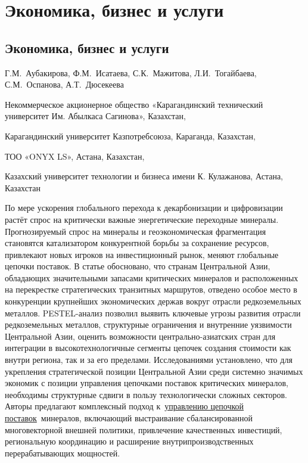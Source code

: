 \let\cleardoublepage\clearpage
\part{Экономика, бизнес и услуги}
\let\cleardoublepage\clearpage
\chapter{Экономика, бизнес и услуги}

\begin{header}

Г.М.~Аубакирова,
Ф.М.~Исатаева\envelope,
С.К.~Мажитова,
Л.И.~Тогайбаева,
С.М.~Оспанова,
А.Т.~Дюсекеева
\end{header}

\begin{affil}
Некоммерческое акционерное общество «Карагандинский технический университет Им. Абылкаса Сагинова», Казахстан,

Карагандинский университет Казпотребсоюза, Караганда, Казахстан,

ТОО «ONYX LS», Астана, Казахстан,

Казахский университет технологии и бизнеса имени К. Кулажанова, Астана, Казахстан

\end{affil}

По мере ускорения глобального перехода к декарбонизации и цифровизации
растёт спрос на критически важные энергетические переходные минералы.
Прогнозируемый спрос на минералы и геоэкономическая фрагментация
становятся катализатором конкурентной борьбы за сохранение ресурсов,
привлекают новых игроков на инвестиционный рынок, меняют глобальные
цепочки поставок. В статье обосновано, что странам Центральной Азии,
обладающих значительными запасами критических минералов и расположенных
на перекрестке стратегических транзитных маршрутов, отведено особое
место в конкуренции крупнейших экономических держав вокруг отрасли
редкоземельных металлов. PESTEL-анализ позволил выявить ключевые угрозы
развития отрасли редкоземельных металлов, структурные ограничения и
внутренние уязвимости Центральной Азии, оценить возможности
центрально-азиатских стран для интеграции в высокотехнологичные сегменты
цепочек создания стоимости как внутри региона, так и за его пределами.
Исследованиями установлено, что для укрепления стратегической позиции
Центральной Азии среди системно значимых экономик с позиции управления
цепочками поставок критических минералов, необходимы структурные сдвиги
в пользу технологически сложных секторов. Авторы предлагают комплексный
подход
к~\href{https://www.sciencedirect.com/topics/earth-and-planetary-sciences/supply-chain-management}{управлению
цепочкой поставок}~минералов, включающий выстраивание сбалансированной
многовекторной внешней политики, привлечение качественных инвестиций,
региональную координацию и расширение внутрипроизводственных
перерабатывающих мощностей.

